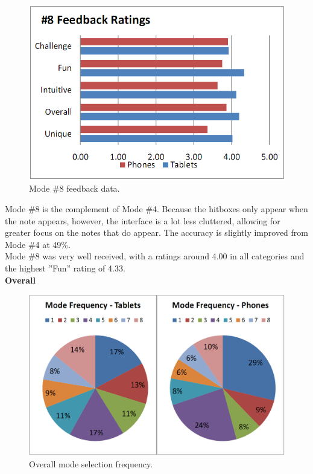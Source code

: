 \documentclass{sig-alternate}
\begin{document}
\begin{figure}[htb!]
	\begin{center}
		\includegraphics[width=1\linewidth]{figure_chart_rating_8}
	\end{center}
	\vspace{-12pt}
	\caption{Mode \#8 feedback data.}
	\label{fig:chart_rating_8}
\end{figure}

Mode \#8 is the complement of Mode \#4. Because the hitboxes only appear when the note appears, however, the interface is a lot less cluttered, allowing for greater focus on the notes that do appear. The accuracy is slightly improved from Mode \#4 at 49\%. \\

Mode \#8 was very well received, with a ratings around 4.00 in all categories and the highest ''Fun'' rating of 4.33. \\

\newpage
\noindent \textbf{Overall}

\begin{figure}[htb!]
	\begin{center}
		\includegraphics[width=1\linewidth]{figure_chart_mode_frequency}
	\end{center}
	\vspace{-12pt}
	\caption{Overall mode selection frequency.}
	\label{fig:chart_mode_frequency}
\end{figure}
\end{document}
